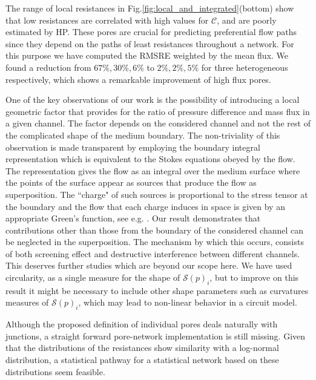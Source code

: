 \documentclass[draft]{agujournal2019}
\begin{document}
The range of local resistances in Fig.\ref{fig:local_and_integrated}(bottom) show that low resistances are correlated with high values for $\mathcal{C}$, and are poorly estimated by HP. These pores are crucial for predicting preferential flow paths since they depend on the paths of least resistances throughout a network. For this purpose we have computed the RMSRE weighted by the mean flux. We found a reduction from $67\%, 30\%, 6\%$ to $2\%, 2\%,5\%$ for three heterogeneous respectively, which shows a remarkable improvement of high flux pores.  

One of the key observations of our work is the possibility of introducing a local geometric factor that provides for the ratio of pressure difference and mass flux in a given channel. The factor depends on the considered channel and not the rest of the complicated shape of the medium boundary. The non-triviality of this observation is made transparent by employing the boundary integral representation which is equivalent to the Stokes equations obeyed by the flow. The representation gives the flow as an integral over the medium surface where the points of the surface appear as sources that produce the flow as superposition. The ``charge" of such sources is proportional to the stress tensor at the boundary and the flow that each charge induces in space is given by an appropriate Green's function, see e.g. \cite{pozrikidis_boundary_1992}. Our result demonstrates that contributions other than those from the boundary of the considered channel can be neglected in the superposition. The mechanism by which this occurs, consists of both screening effect and destructive interference between different channels. This deserves further studies which are beyond our scope here. We have used circularity, as a single measure for the shape of $\mathcal{S}(p)_i$, but to improve on this result it might be necessary to include other shape parameters such as curvatures measures of $\mathcal{S}(p)_i$, which may lead to non-linear behavior in a circuit model. 

Although the proposed definition of individual pores deals naturally with junctions, a straight forward pore-network implementation is still missing. Given that the distributions of the resistances show similarity with a log-normal distribution, a statistical pathway for a statistical network based on these distributions seem feasible.  
\end{document}
